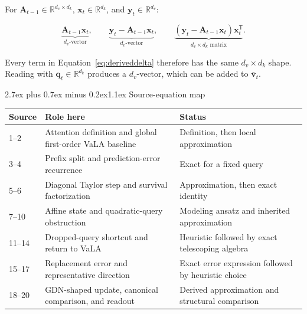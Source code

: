 \documentclass[11pt]{article}
\makeatletter
\newcommand{\vect}[1]{\bm{#1}}
\newcommand{\trans}{^{\mathsf T}}
\newcommand{\R}{\mathbb{R}}
\renewcommand\section{\@startsection{section}{1}{0pt}%
  {2.7ex plus 0.7ex minus 0.2ex}{1.1ex}%
  {\normalfont\sffamily\Large\bfseries\color{Ink}}}
\makeatother
\begin{document}
For $\vect A_{t-1}\in\R^{d_v\times d_k}$,
$\vect x_t\in\R^{d_k}$, and $\vect y_t\in\R^{d_v}$:

\[
  \underbrace{\vect A_{t-1}\vect x_t}_{d_v\text{-vector}},
  \qquad
  \underbrace{\vect y_t-\vect A_{t-1}\vect x_t}_{d_v\text{-vector}},
  \qquad
  \underbrace{(\vect y_t-\vect A_{t-1}\vect x_t)\vect x_t\trans}_{d_v\times d_k\text{ matrix}}.
\]

Every term in Equation~\eqref{eq:deriveddelta} therefore has the same
$d_v\times d_k$ shape. Reading with $\vect q_t\in\R^{d_k}$ produces a
$d_v$-vector, which can be added to $\bar{\vect v}_t$.

\section{Source-equation map}

\begin{tabularx}{\textwidth}{@{}P{18mm}P{43mm}Y@{}}
\toprule
\textbf{Source} & \textbf{Role here} & \textbf{Status} \\
--2 & Attention definition and global first-order VaLA baseline & Definition, then local approximation \\
3--4 & Prefix split and prediction-error recurrence & Exact for a fixed query \\
5--6 & Diagonal Taylor step and survival factorization & Approximation, then exact identity \\
7--10 & Affine state and quadratic-query obstruction & Modeling ansatz and inherited approximation \\
11--14 & Dropped-query shortcut and return to VaLA & Heuristic followed by exact telescoping algebra \\
15--17 & Replacement error and representative direction & Exact error expression followed by heuristic choice \\
18--20 & GDN-shaped update, canonical comparison, and readout & Derived approximation and structural comparison \\
\bottomrule
\end{tabularx}



\end{document}
